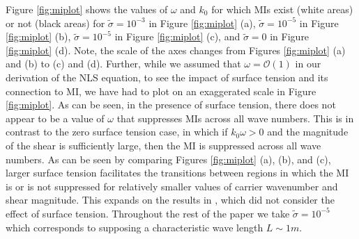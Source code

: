 \documentclass{JFM_Style/jfm}
\begin{document}
Figure \ref{fig:miplot} shows the values of $\omega$ and $k_{0}$ for which MIs exist (white areas) or not (black areas) for $\tilde{\sigma}=10^{-3}$ in Figure \ref{fig:miplot} (a), $\tilde{\sigma}=10^{-5}$ in Figure \ref{fig:miplot} (b), $\tilde{\sigma}=10^{-5}$ in Figure \ref{fig:miplot} (c), and $\tilde{\sigma}=0$ in Figure \ref{fig:miplot} (d).   Note, the scale of the axes changes from Figures \ref{fig:miplot} (a) and (b) to (c) and (d).  Further, while we assumed that $\omega = \mathcal{O}(1)$ in our derivation of the NLS equation, to see the impact of surface tension and its connection to MI, we have had to plot on an exaggerated scale in Figure \ref{fig:miplot}.  As can be seen, in the presence of surface tension, there does not appear to be a value of $\omega$ that suppresses MIs across all wave numbers.  This is in contrast to the zero surface tension case, in which if $k_{0}\omega>0$ and the magnitude of the shear is sufficiently large, then the MI is suppressed across all wave numbers.  As can be seen by comparing Figures \ref{fig:miplot} (a), (b), and (c), larger surface tension facilitates the transitions between regions in which the MI is or is not suppressed for relatively smaller values of carrier wavenumber and shear magnitude.  This expands on the results in \cite{thomas2012nonlinear}, which did not consider the effect of surface tension.  Throughout the rest of the paper we take $\tilde{\sigma}=10^{-5}$ which corresponds to supposing a characteristic wave length $L\sim 1m$.
\end{document}
